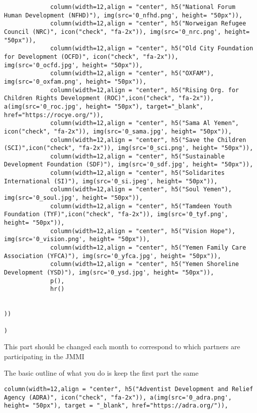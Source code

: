 \documentclass[
]{article}
\begin{document}
\begin{verbatim}
             column(width=12,align = "center", h5("National Forum Human Development (NFHD)"), img(src='0_nfhd.png', height= "50px")),
             column(width=12,align = "center", h5("Norweigan Refugee Council (NRC)", icon("check", "fa-2x")), img(src='0_nrc.png', height= "50px")),
             column(width=12,align = "center", h5("Old City Foundation for Development (OCFD)", icon("check", "fa-2x")), img(src='0_ocfd.jpg', height= "50px")),
             column(width=12,align = "center", h5("OXFAM"), img(src='0_oxfam.png', height= "50px")),
             column(width=12,align = "center", h5("Rising Org. for Children Rights Development (ROC)",icon("check", "fa-2x")), a(img(src='0_roc.jpg', height= "50px"), target="_blank", href="https://rocye.org/")),
             column(width=12,align = "center", h5("Sama Al Yemen", icon("check", "fa-2x")), img(src='0_sama.jpg', height= "50px")),
             column(width=12,align = "center", h5("Save the Children (SCI)",icon("check", "fa-2x")), img(src='0_sci.png', height= "50px")),
             column(width=12,align = "center", h5("Sustainable Development Foundation (SDF)"), img(src='0_sdf.jpg', height= "50px")),
             column(width=12,align = "center", h5("Solidarites International (SI)"), img(src='0_si.jpeg', height= "50px")),
             column(width=12,align = "center", h5("Soul Yemen"), img(src='0_soul.jpg', height= "50px")),
             column(width=12,align = "center", h5("Tamdeen Youth Foundation (TYF)",icon("check", "fa-2x")), img(src='0_tyf.png', height= "50px")),
             column(width=12,align = "center", h5("Vision Hope"), img(src='0_vision.png', height= "50px")),
             column(width=12,align = "center", h5("Yemen Family Care Association (YFCA)"), img(src='0_yfca.jpg', height= "50px")),
             column(width=12,align = "center", h5("Yemen Shoreline Development (YSD)"), img(src='0_ysd.jpg', height= "50px")),
             p(),
             hr()

             
))

)
\end{verbatim}

This part should be changed each month to correspond to which partners
are participating in the JMMI

The basic outline of what you do is keep the first part the same

\begin{verbatim}
column(width=12,align = "center", h5("Adventist Development and Relief Agency (ADRA)", icon("check", "fa-2x")), a(img(src='0_adra.png', height= "50px"), target = "_blank", href="https://adra.org/")),
\end{verbatim}
\end{document}
